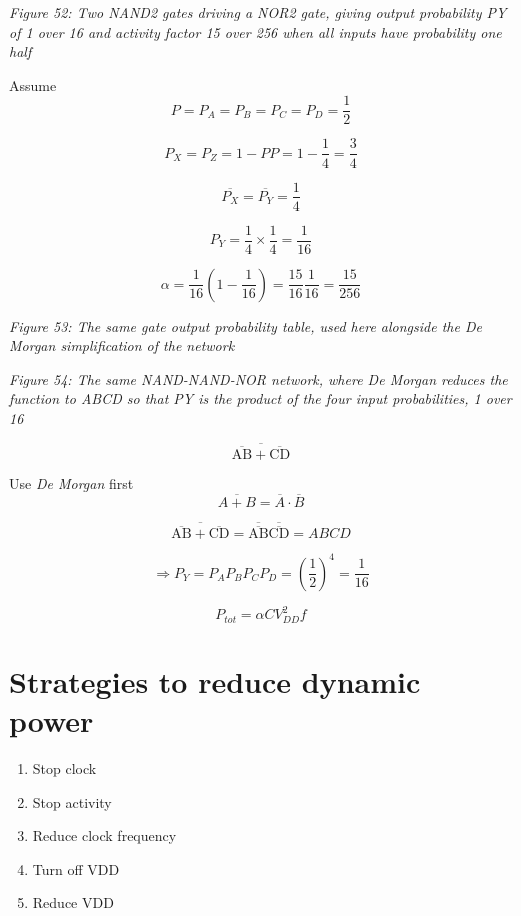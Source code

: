{
\centering
{}
}

\emph{Figure 52: Two NAND2 gates driving a NOR2 gate, giving output
probability PY of 1 over 16 and activity factor 15 over 256 when all
inputs have probability one half}

Assume \[P = P_A = P_B = P_C = P_D = \frac{1}{2}\]

\[P_X = P_Z =  1 - P P = 1 - \frac{1}{4} = \frac{3}{4}\]

\[\overline{P_X} = \overline{P_Y} = \frac{1}{4}\]

\[P_Y = \frac{1}{4} \times \frac{1}{4} = \frac{1}{16}\]

\[\alpha = \frac{1}{16}\left(1 - \frac{1}{16}\right) = \frac{15}{16}\frac{1}{16} = \frac{15}{256}\]


{
\centering
{}
}

\emph{Figure 53: The same gate output probability table, used here
alongside the De Morgan simplification of the network}


{
\centering
{}
}

\emph{Figure 54: The same NAND-NAND-NOR network, where De Morgan reduces
the function to ABCD so that PY is the product of the four input
probabilities, 1 over 16}

\[ \overline{\overline{\text{AB}} + \overline{\text{CD}}} \]

Use \emph{De Morgan} first
\[\overline{A+B}  = \overline{A} \cdot \overline{B}\]

\[\overline{\overline{\text{AB}} + \overline{\text{CD}}} = \overline{\overline{\text{AB}}} \overline{\overline{\text{CD}}} = ABCD\]

\[\Rightarrow P_Y = P_A P_B P_C P_D = \left(\frac{1}{2}\right)^4 = \frac{1}{16} \]

\[P_{tot} = \alpha C V_{DD}^2 f\]

\section{Strategies to reduce dynamic
power}\label{strategies-to-reduce-dynamic-power}

\begin{enumerate}
\def\labelenumi{\arabic{enumi}.}
\tightlist
\item
  Stop clock
\item
  Stop activity
\item
  Reduce clock frequency
\item
  Turn off VDD
\item
  Reduce VDD
\end{enumerate}


